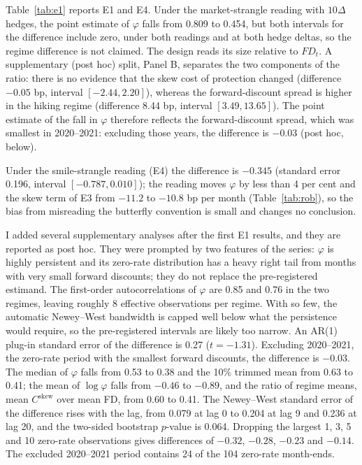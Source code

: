 \documentclass[11pt]{article}
\theoremstyle{result}
\newcommand{\FD}{\mathit{FD}}
\newcommand{\Cskew}{C^{\mathrm{skew}}}
\newcommand{\D}{\Delta}
\begin{document}
Table~\ref{tab:e1} reports E1 and E4. Under the market-strangle reading with $10\D$ hedges, the point estimate of $\varphi$ falls from 0.809 to 0.454, but both intervals for the difference include zero, under both readings and at both hedge deltas, so the regime difference is not claimed. The design reads its size relative to $\FD_t$. A supplementary (post hoc) split, Panel B, separates the two components of the ratio: there is no evidence that the skew cost of protection changed (difference $-0.05$ bp, interval $[-2.44,2.20]$), whereas the forward-discount spread is higher in the hiking regime (difference 8.44 bp, interval $[3.49,13.65]$). The point estimate of the fall in $\varphi$ therefore reflects the forward-discount spread, which was smallest in 2020--2021: excluding those years, the difference is $-0.03$ (post hoc, below).

Under the smile-strangle reading (E4) the difference is $-0.345$ (standard error 0.196, interval $[-0.787,0.010]$); the reading moves $\varphi$ by less than 4 per cent and the skew term of E3 from $-11.2$ to $-10.8$ bp per month (Table~\ref{tab:rob}), so the bias from misreading the butterfly convention is small and changes no conclusion.

I added several supplementary analyses after the first E1 results, and they are reported as post hoc. They were prompted by two features of the series: $\varphi$ is highly persistent and its zero-rate distribution has a heavy right tail from months with very small forward discounts; they do not replace the pre-registered estimand. The first-order autocorrelations of $\varphi$ are 0.85 and 0.76 in the two regimes, leaving roughly 8 effective observations per regime. With so few, the automatic Newey--West bandwidth is capped well below what the persistence would require, so the pre-registered intervals are likely too narrow. An AR(1) plug-in standard error of the difference is 0.27 ($t=-1.31$). Excluding 2020--2021, the zero-rate period with the smallest forward discounts, the difference is $-0.03$. The median of $\varphi$ falls from 0.53 to 0.38 and the 10\% trimmed mean from 0.63 to 0.41; the mean of $\log\varphi$ falls from $-0.46$ to $-0.89$, and the ratio of regime means, mean $\Cskew$ over mean FD, from 0.60 to 0.41. The Newey--West standard error of the difference rises with the lag, from 0.079 at lag 0 to 0.204 at lag 9 and 0.236 at lag 20, and the two-sided bootstrap $p$-value is 0.064. Dropping the largest 1, 3, 5 and 10 zero-rate observations gives differences of $-0.32$, $-0.28$, $-0.23$ and $-0.14$. The excluded 2020--2021 period contains 24 of the 104 zero-rate month-ends.
\end{document}
